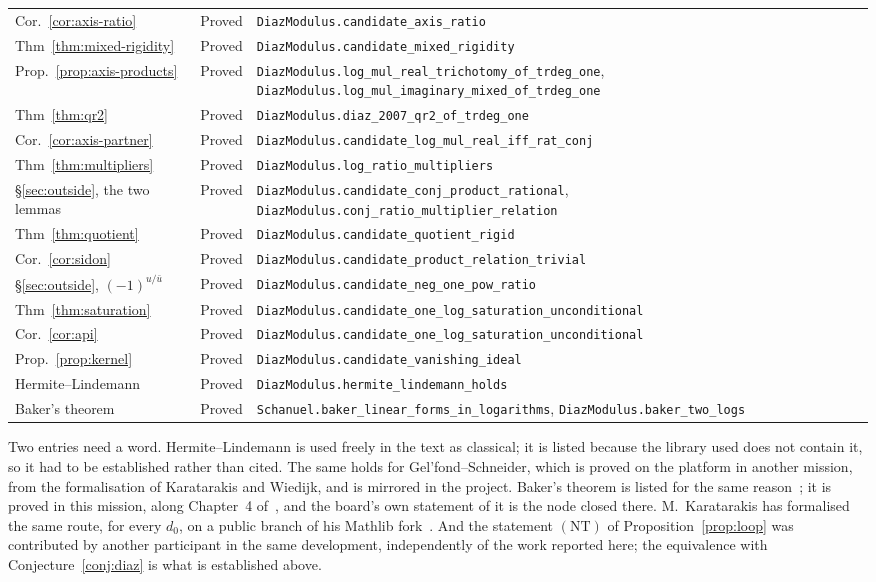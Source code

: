 \documentclass[11pt,a4paper]{article}
\theoremstyle{plain}
\theoremstyle{definition}
\begin{document}
\begin{center}
\begin{longtable}{@{}llp{6.2cm}@{}}
Cor.~\ref{cor:axis-ratio} & Proved & \nolinkurl{DiazModulus.candidate_axis_ratio} \\
Thm~\ref{thm:mixed-rigidity} & Proved & \nolinkurl{DiazModulus.candidate_mixed_rigidity} \\
Prop.~\ref{prop:axis-products} & Proved & \nolinkurl{DiazModulus.log_mul_real_trichotomy_of_trdeg_one}, \nolinkurl{DiazModulus.log_mul_imaginary_mixed_of_trdeg_one} \\
Thm~\ref{thm:qr2} & Proved & \nolinkurl{DiazModulus.diaz_2007_qr2_of_trdeg_one} \\
Cor.~\ref{cor:axis-partner} & Proved & \nolinkurl{DiazModulus.candidate_log_mul_real_iff_rat_conj} \\
Thm~\ref{thm:multipliers} & Proved & \nolinkurl{DiazModulus.log_ratio_multipliers} \\
\S\ref{sec:outside}, the two lemmas & Proved & \nolinkurl{DiazModulus.candidate_conj_product_rational}, \nolinkurl{DiazModulus.conj_ratio_multiplier_relation} \\
Thm~\ref{thm:quotient} & Proved & \nolinkurl{DiazModulus.candidate_quotient_rigid} \\
Cor.~\ref{cor:sidon} & Proved & \nolinkurl{DiazModulus.candidate_product_relation_trivial} \\
\S\ref{sec:outside}, $(-1)^{u/\bar u}$ & Proved & \nolinkurl{DiazModulus.candidate_neg_one_pow_ratio} \\
Thm~\ref{thm:saturation} & Proved & \nolinkurl{DiazModulus.candidate_one_log_saturation_unconditional} \\
Cor.~\ref{cor:api} & Proved & \nolinkurl{DiazModulus.candidate_one_log_saturation_unconditional} \\
Prop.~\ref{prop:kernel} & Proved & \nolinkurl{DiazModulus.candidate_vanishing_ideal} \\
Hermite--Lindemann & Proved & \nolinkurl{DiazModulus.hermite_lindemann_holds} \\
Baker's theorem & Proved & \nolinkurl{Schanuel.baker_linear_forms_in_logarithms}, \nolinkurl{DiazModulus.baker_two_logs} \\
\end{longtable}
\end{center}

Two entries need a word. Hermite--Lindemann is used freely in the text as classical; it is listed
because the library used does not contain it, so it had to be established rather than cited. The
same holds for Gel'fond--Schneider, which is proved on the platform in another mission, from the
formalisation of Karatarakis and Wiedijk, and is mirrored in the project. Baker's theorem is listed
for the same reason~\cite{baker-1966}; it is proved in this mission, along Chapter~4
of~\cite{waldschmidt-book}, and the board's own statement of it is the node closed there.
M.~Karatarakis has formalised the same route, for every $d_{0}$, on a public branch of his
Mathlib fork~\cite{karatarakis-baker}. And
the statement $(\mathrm{NT})$ of Proposition~\ref{prop:loop} was contributed by another
participant in the same development, independently of the work reported here; the equivalence
with Conjecture~\ref{conj:diaz} is what is established above.
\end{document}
